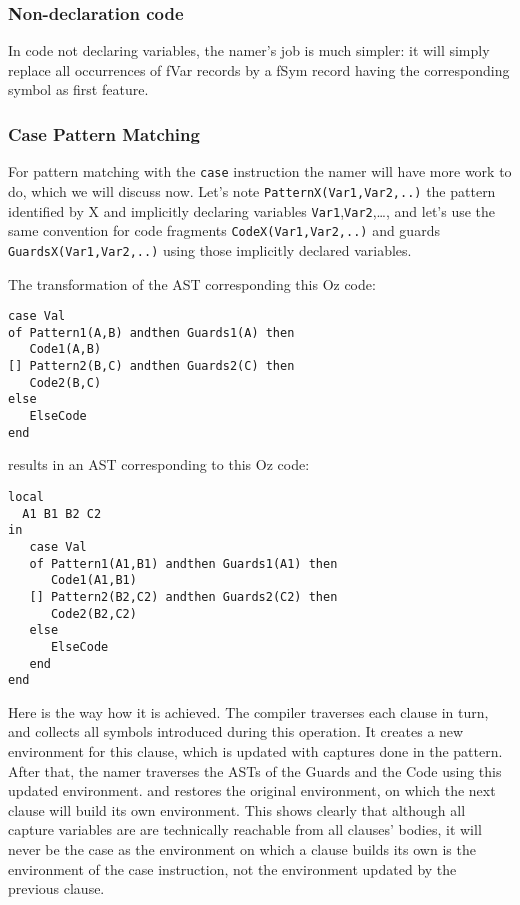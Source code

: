 \documentclass[a4paper]{memoir}
\begin{document}
\subsubsection{Non-declaration code}
In code not declaring variables, the namer's job is much simpler: it will simply
replace all occurrences of fVar records by a fSym record having the corresponding symbol as first feature.
\subsubsection{Case Pattern Matching}\label{sec:arch:namer:patternmatching}
For pattern matching with the \lstinline!case! instruction the namer will have
more work to do, which we will discuss now. Let's note
\lstinline!PatternX(Var1,Var2,..)! the pattern identified by X and implicitly
declaring variables \lstinline!Var1!,\lstinline!Var2!,\ldots, and let's use the same convention for code fragments \lstinline!CodeX(Var1,Var2,..)! and guards \lstinline!GuardsX(Var1,Var2,..)! using those implicitly declared variables.

The transformation of the AST corresponding this Oz code:
\begin{lstlisting}
case Val
of Pattern1(A,B) andthen Guards1(A) then
   Code1(A,B)
[] Pattern2(B,C) andthen Guards2(C) then
   Code2(B,C)
else
   ElseCode
end
\end{lstlisting}
results in an AST corresponding to this Oz code:
\begin{lstlisting}
local
  A1 B1 B2 C2
in
   case Val
   of Pattern1(A1,B1) andthen Guards1(A1) then
      Code1(A1,B1)
   [] Pattern2(B2,C2) andthen Guards2(C2) then
      Code2(B2,C2)
   else
      ElseCode
   end
end
\end{lstlisting}

Here is the way how it is achieved. The compiler traverses each clause in turn,
and collects all symbols introduced during this operation. It creates a new
environment for this clause, which is updated with captures done in the
pattern. After that, the namer traverses the ASTs of the Guards and the Code
using this updated environment. and restores the original environment, on which
the next clause will build its own environment. This shows clearly that
although all capture variables are are technically reachable from all clauses'
bodies, it will never be the case as the environment on which a clause builds
its own is the environment of the case instruction, not the environment updated
by the previous clause. 
\end{document}
